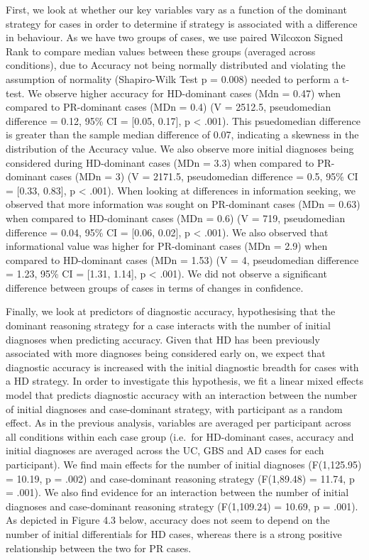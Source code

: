 \documentclass[a4paper, nobind]{templates/ociamthesis}
\begin{document}
\hfill\break
First, we look at whether our key variables vary as a function of the dominant strategy for cases in order to determine if strategy is associated with a difference in behaviour. As we have two groups of cases, we use paired Wilcoxon Signed Rank to compare median values between these groups (averaged across conditions), due to Accuracy not being normally distributed and violating the assumption of normality (Shapiro-Wilk Test p = 0.008) needed to perform a t-test. We observe higher accuracy for HD-dominant cases (Mdn = 0.47) when compared to PR-dominant cases (MDn = 0.4) (V = 2512.5, pseudomedian difference = 0.12, 95\% CI = {[}0.05, 0.17{]}, p \textless{} .001). This psuedomedian difference is greater than the sample median difference of 0.07, indicating a skewness in the distribution of the Accuracy value. We also observe more initial diagnoses being considered during HD-dominant cases (MDn = 3.3) when compared to PR-dominant cases (MDn = 3) (V = 2171.5, pseudomedian difference = 0.5, 95\% CI = {[}0.33, 0.83{]}, p \textless{} .001). When looking at differences in information seeking, we observed that more information was sought on PR-dominant cases (MDn = 0.63) when compared to HD-dominant cases (MDn = 0.6) (V = 719, pseudomedian difference = 0.04, 95\% CI = {[}0.06, 0.02{]}, p \textless{} .001). We also observed that informational value was higher for PR-dominant cases (MDn = 2.9) when compared to HD-dominant cases (MDn = 1.53) (V = 4, pseudomedian difference = 1.23, 95\% CI = {[}1.31, 1.14{]}, p \textless{} .001). We did not observe a significant difference between groups of cases in terms of changes in confidence.

\hfill\break
Finally, we look at predictors of diagnostic accuracy, hypothesising that the dominant reasoning strategy for a case interacts with the number of initial diagnoses when predicting accuracy. Given that HD has been previously associated with more diagnoses being considered early on, we expect that diagnostic accuracy is increased with the initial diagnostic breadth for cases with a HD strategy. In order to investigate this hypothesis, we fit a linear mixed effects model that predicts diagnostic accuracy with an interaction between the number of initial diagnoses and case-dominant strategy, with participant as a random effect. As in the previous analysis, variables are averaged per participant across all conditions within each case group (i.e.~for HD-dominant cases, accuracy and initial diagnoses are averaged across the UC, GBS and AD cases for each participant). We find main effects for the number of initial diagnoses (F(1,125.95) = 10.19, p = .002) and case-dominant reasoning strategy (F(1,89.48) = 11.74, p = .001). We also find evidence for an interaction between the number of initial diagnoses and case-dominant reasoning strategy (F(1,109.24) = 10.69, p = .001). As depicted in Figure 4.3 below, accuracy does not seem to depend on the number of initial differentials for HD cases, whereas there is a strong positive relationship between the two for PR cases.
\end{document}
